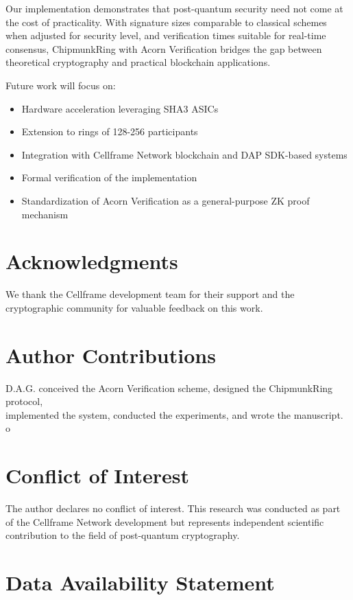 \documentclass[11pt,a4paper]{article}
\begin{document}
Our implementation demonstrates that post-quantum security need not come at the cost of practicality. With signature sizes comparable to classical schemes when adjusted for security level, and verification times suitable for real-time consensus, ChipmunkRing with Acorn Verification bridges the gap between theoretical cryptography and practical blockchain applications.

Future work will focus on:
\begin{itemize}
\item Hardware acceleration leveraging SHA3 ASICs
\item Extension to rings of 128-256 participants
\item Integration with Cellframe Network blockchain and DAP SDK-based systems
\item Formal verification of the implementation
\item Standardization of Acorn Verification as a general-purpose ZK proof mechanism
\end{itemize}

\section{Acknowledgments}

We thank the Cellframe development team for their support and the cryptographic community for valuable feedback on this work.

\section*{Author Contributions}

D.A.G. conceived the Acorn Verification scheme, designed the ChipmunkRing protocol, \\
implemented the system, conducted the experiments, and wrote the manuscript.
o
\section*{Conflict of Interest}

The author declares no conflict of interest. This research was conducted as part of the Cellframe Network development but represents independent scientific contribution to the field of post-quantum cryptography.

\section*{Data Availability Statement}
\end{document}
